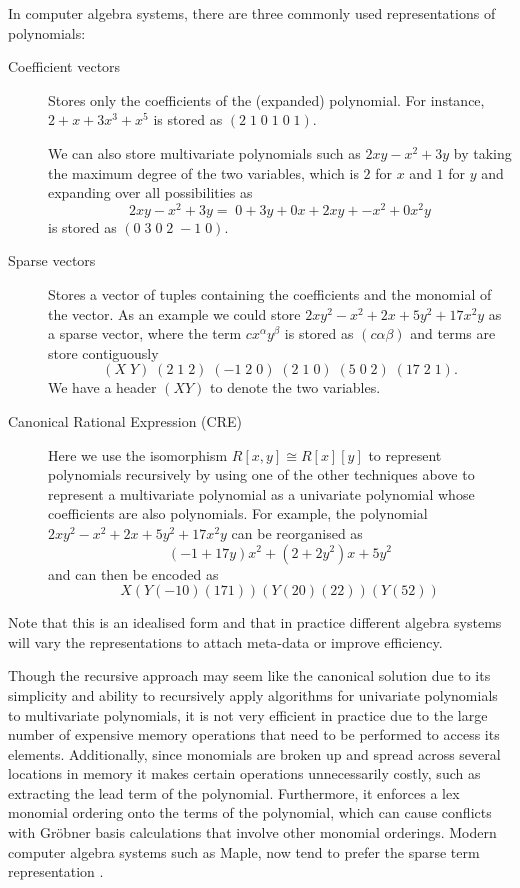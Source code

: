 In computer algebra systems, there are three commonly used representations of polynomials: 
\begin{description}
    \item[Coefficient vectors] Stores only the coefficients of the (expanded) polynomial. For instance, $2 + x + 3x^3 + x^5$ is stored as $(2\; 1\; 0\; 1\; 0\; 1)$.

        We can also store multivariate polynomials such as $2xy - x^2 + 3y$ by taking the maximum degree of the two variables, which is $2$ for $x$ and $1$ for $y$ and expanding over all possibilities as 
        \[
            2xy - x^2 + 3y = \;0 + 3y + 0x + 2xy + \minus x^2 + 0x^2y
        \]
        is stored as  $(0\; 3\; 0\; 2\; \minus 1\; 0)$.
    \item[Sparse vectors] Stores a vector of tuples containing the coefficients and the monomial of the vector. As an example we could store $2xy^2 - x^2 + 2x + 5y^2 + 17x^2 y$ as a sparse vector, where the term $c x^\alpha y^\beta$ is stored as $(c \alpha \beta)$ and terms are store contiguously
        \[  
            (X\; Y)\; (2\; 1\; 2)\; (\minus 1\; 2\; 0)\; (2\; 1\; 0)\; (5\; 0\; 2)\; (17\; 2\; 1).
        \]
        We have a header $(X Y)$ to denote the two variables.

    \item[Canonical Rational Expression (CRE)] Here we use the isomorphism $R[x, y] \cong R[x][y]$ to represent polynomials recursively by using one of the other techniques above to represent a multivariate polynomial as a univariate polynomial whose coefficients are also polynomials. For example, the polynomial $2xy^2 - x^2 + 2x + 5y^2 + 17x^2 y$ can be reorganised as
        \[
            (\minus 1 + 17y)x^2 + (2 + 2y^2)x + 5y^2
        \]
        and can then be encoded as
        \[
            X ( Y (-1 0) (17 1) ) ( Y (2 0) (2 2) ) ( Y (5 2) ) 
        \]
\end{description}

Note that this is an idealised form and that in practice different algebra systems will vary the representations to attach meta-data or improve efficiency.

\medskip

Though the recursive approach may seem like the canonical solution due to its simplicity and ability to recursively apply algorithms for univariate polynomials to multivariate polynomials, it is not very efficient in practice due to the large number of expensive memory operations that need to be performed to access its elements. Additionally, since monomials are broken up and spread across several locations in memory it makes certain operations unnecessarily costly, such as extracting the lead term of the polynomial. Furthermore, it enforces a lex monomial ordering onto the terms of the polynomial, which can cause conflicts with Gr\"{o}bner basis calculations that involve other monomial orderings. Modern computer algebra systems such as Maple, now tend to prefer the sparse term representation \cite{maple-new-poly-structure}.

